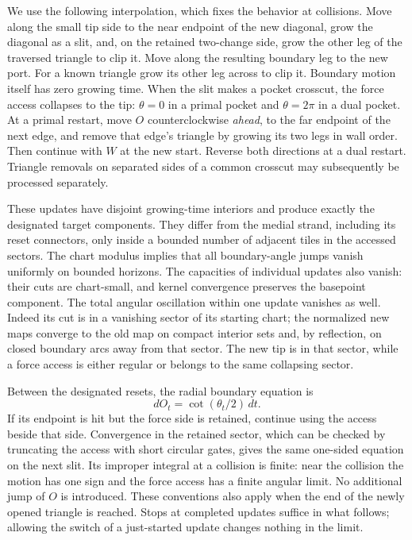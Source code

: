 We use the following interpolation, which fixes the behavior at
collisions.  Move along the small tip side to the near endpoint of the
new diagonal, grow the diagonal as a slit, and, on the retained
two-change side, grow the other leg of the traversed triangle to clip
it.  Move along the resulting boundary leg to the new port.  For a
known triangle grow its other leg across to clip it.  Boundary motion
itself has zero growing time.  When the slit makes a pocket crosscut,
the force access collapses to the tip: $\theta=0$ in a primal pocket
and $\theta=2\pi$ in a dual pocket.  At a primal restart, move $O$
counterclockwise \emph{ahead}, to the far endpoint of the next edge,
and remove that edge's triangle by growing its two legs in wall order.
Then continue with $W$ at the new start.  Reverse both directions at
a dual restart.  Triangle removals on separated sides of a common
crosscut may subsequently be processed separately.

These updates have disjoint growing-time interiors and produce
exactly the designated target components.  They differ from the medial
strand, including its reset connectors, only inside a bounded number
of adjacent tiles in the accessed sectors.  The chart modulus implies
that all boundary-angle jumps vanish uniformly on bounded horizons.
The capacities of individual updates also vanish: their cuts are
chart-small, and kernel convergence preserves the basepoint component.
The total angular oscillation within one update vanishes as well.
Indeed its cut is in a vanishing sector of its starting chart; the
normalized new maps converge to the old map on compact interior sets
and, by reflection, on closed boundary arcs away from that sector.
The new tip is in that sector, while a force access is either regular
or belongs to the same collapsing sector.

Between the designated resets, the radial boundary equation is
\begin{equation}\label{peel:force-ode}
 dO_t=\cot(\theta_t/2)\,dt.
\end{equation}
If its endpoint is hit but the force side is retained, continue using
the access beside that side.  Convergence in the retained sector,
which can be checked by truncating the access with short circular
gates, gives the same one-sided equation on the next slit.  Its
improper integral at a collision is finite: near the collision the
motion has one sign and the force access has a finite angular limit.
No additional jump of $O$ is introduced.  These conventions also apply
when the end of the newly opened triangle is reached.  Stops at
completed updates suffice in what follows; allowing the switch of a
just-started update changes nothing in the limit.

